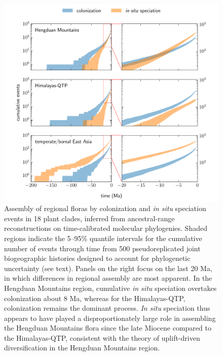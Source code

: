 \documentclass[9pt,twocolumn,twoside,lineno]{pnas-new}
\begin{document}
\begin{figure}
\centering
\includegraphics[width=.99\linewidth]{figures/figure_cumulative_events/figure_cumulative_events.pdf}
\caption{Assembly of regional floras by colonization and \textit{in
    situ} speciation events in 18 plant clades, inferred from
  ancestral-range reconstructions on time-calibrated molecular
  phylogenies. Shaded regions indicate the 5--95\% quantile intervals
  for the cumulative number of events through time from 500
  pseudoreplicated joint biogeographic histories designed to account
  for phylogenetic uncertainty (see text). Panels on the right focus
  on the last 20 Ma, in which differences in regional assembly are
  most apparent. In the Hengduan Mountains region, cumulative
  \textit{in situ} speciation overtakes colonization about 8 Ma,
  whereas for the Himalayas-QTP, colonization remains the dominant
  process. \textit{In situ} speciation thus appears to have played a
  disproportionately large role in assembling the Hengduan Mountains
  flora since the late Miocene compared to the Himalayas-QTP,
  consistent with the theory of uplift-driven diversification in the
  Hengduan Mountains region.}
\label{fig:cumevents}
\end{figure}
\end{document}
